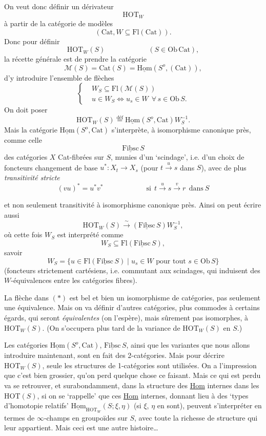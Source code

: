 \documentclass[11pt]{article}
\newcommand{\printedpage}[1]{\marginpar{\footnotesize p.~#1}}
\newcommand{\msp}[1]{\marginpar{\footnotesize [#1]}}
\newcommand{\deq}{\overset{\text{déf}}{=}}
\newcommand{\ul}[1]{\underline{\mathrm{#1}}}
\begin{document}
\noindent On veut donc définir un dérivateur
\[
\mathrm{HOT}_W
\]
à partir de la catégorie de modèles
\[
(\mathrm{Cat}, W \subseteq \mathrm{Fl}(\mathrm{Cat})).
\]
Donc pour définir
\[
\mathrm{HOT}_W(S) \qquad\qquad\qquad (S \in \mathrm{Ob}\,\mathrm{Cat}),
\]
la récette générale est de prendre la catégorie %
\[
\mathcal{M}(S) = \mathrm{Cat}(S) = \underline{\mathrm{Hom}}(S^o, (\mathrm{Cat})),
\]
d'y introduire l'ensemble de flèches
\[
\left\{
\begin{aligned}
& W_S \subseteq \mathrm{Fl}(\mathcal{M}(S)) \\
& u \in W_S \Longleftrightarrow u_s \in W \ \ \forall\, s \in \mathrm{Ob}\,S.
\end{aligned}
\right.
\]
On doit poser
\[
\mathrm{HOT}_W(S) \deq \underline{\mathrm{Hom}}(S^o, \mathrm{Cat})W_S^{-1}.
\]
Mais la catégorie $\underline{\mathrm{Hom}}(S^o, \mathrm{Cat})$ s'interprète, à isomorphisme canonique près, comme celle
\[
\underline{\mathrm{Fibsc}}\,S
\]
des catégories $X$ Cat-fibrées sur $S$, munies d'un `scindage', i.e. d'un choix de foncteurs changement de base $u^* : X_t \longrightarrow X_s$ (pour $t \xrightarrow{u} s$ dans $S$), avec de plus \textit{transitivité stricte}
\[
(vu)^* = u^* v^* \qquad\qquad\qquad \text{si}\ \ t \xrightarrow{u} s \xrightarrow{v} r\ \ \text{dans}\ S
\]

\noindent\msp{page 4}

\printedpage{4}
et non seulement transitivité à isomorphisme canonique près. Ainsi on peut écrire aussi
\[
\mathrm{HOT}_W(S) \xrightarrow{\ \sim\ } (\ul{Fibsc}\,S)W_S^{-1}, \tag*{$(*)$}
\]
où cette fois $W_S$ est interprété comme
\[
W_S \subseteq \mathrm{Fl}(\ul{Fibsc}\,S),
\]
savoir
\[
W_S = \{u \in \mathrm{Fl}(\ul{Fibsc}\,S) \mid u_s \in W \text{ pour tout } s \in \mathrm{Ob}\,S\}
\]
(foncteurs strictement cartésiens, i.e. commutant aux scindages, qui induisent des $W$-équivalences entre les catégories fibres).

La flèche dans $(*)$ est bel et bien un isomorphisme de catégories, pas seulement une équivalence. Mais on va définir d'autres catégories, plus commodes à certains égards, qui seront \textit{équivalentes} (on l'espère), mais sûrement pas isomorphes, à $\mathrm{HOT}_W(S)$. (On s'occupera plus tard de la variance de $\mathrm{HOT}_W(S)$ en $S$.)

Les catégories $\ul{Hom}(S^o,\mathrm{Cat})$, $\ul{Fibsc}\,S$, ainsi que les variantes que nous allons introduire maintenant, sont en fait des 2-catégories. Mais pour décrire $\mathrm{HOT}_W(S)$, seule les structures de 1-catégories sont utilisées. On a l'impression que c'est bien %
\msp{page 5}
grossier, qu'on perd quelque chose ce faisant. Mais ce qui est perdu va se retrouver, et surabondamment, dans la structure des \underline{Hom} internes dans les $\mathrm{HOT}(S)$, si on se `rappelle' que ces \underline{Hom} internes, donnant lieu à des `types d'homotopie relatifs' $\ul{Hom}_{\mathrm{HOT}_W}(S;\xi,\eta)$ (si $\xi$, $\eta$ en sont), peuvent s'interpréter en termes de $\infty$-champs en groupoïdes sur $S$, avec toute la richesse de structure qui leur appartient. Mais ceci est une autre histoire\dots
\end{document}

